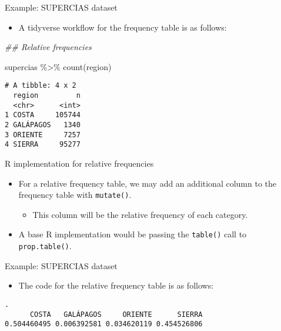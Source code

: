\documentclass[
  10pt,
  ignorenonframetext,
]{beamer}
\newenvironment{Shaded}{\begin{snugshade}}{\end{snugshade}}
\newcommand{\DocumentationTok}[1]{\textcolor[rgb]{0.37,0.37,0.37}{\textit{#1}}}
\newcommand{\FunctionTok}[1]{\textcolor[rgb]{0.28,0.35,0.67}{#1}}
\newcommand{\NormalTok}[1]{\textcolor[rgb]{0.00,0.23,0.31}{#1}}
\newcommand{\SpecialCharTok}[1]{\textcolor[rgb]{0.37,0.37,0.37}{#1}}
\providecommand{\tightlist}{%
  \setlength{\itemsep}{0pt}\setlength{\parskip}{0pt}}\usepackage{longtable,booktabs,array}
\begin{document}
\begin{frame}[fragile]{Example: SUPERCIAS dataset}
\label{example-supercias-dataset-1}
\begin{itemize}
\tightlist
\item
  A tidyverse workflow for the frequency table is as follows:
\end{itemize}

\begin{Shaded}
\begin{Highlighting}[]
\DocumentationTok{\#\# Relative frequencies}

\NormalTok{supercias }\SpecialCharTok{\%\textgreater{}\%}
    \FunctionTok{count}\NormalTok{(region)}
\end{Highlighting}
\end{Shaded}

\begin{verbatim}
# A tibble: 4 x 2
  region         n
  <chr>      <int>
1 COSTA     105744
2 GALÁPAGOS   1340
3 ORIENTE     7257
4 SIERRA     95277
\end{verbatim}
\end{frame}

\begin{frame}[fragile]{R implementation for relative frequencies}
\label{r-implementation-for-relative-frequencies}
\begin{itemize}
\tightlist
\item
  For a relative frequency table, we may add an additional column to the
  frequency table with \texttt{mutate()}.

  \begin{itemize}
  \tightlist
  \item
    This column will be the relative frequency of each category.
  \end{itemize}
\item
  A base R implementation would be passing the \texttt{table()} call to
  \texttt{prop.table()}.
\end{itemize}
\end{frame}

\begin{frame}[fragile]{Example: SUPERCIAS dataset}
\label{example-supercias-dataset-2}
\begin{itemize}
\tightlist
\item
  The code for the relative frequency table is as follows:
\end{itemize}

\begin{Shaded}
\end{Shaded}

\begin{verbatim}
.
      COSTA   GALÁPAGOS     ORIENTE      SIERRA 
0.504460495 0.006392581 0.034620119 0.454526806 
\end{verbatim}
\end{frame}
\end{document}

